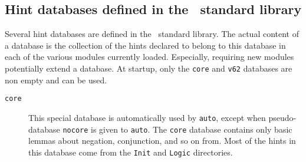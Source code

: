\begin{coq_example*}





\subsection{Hint databases defined in the \Coq\ standard library}

Several hint databases are defined in the \Coq\ standard library.  The
actual content of a database is the collection of the hints declared
to belong to this database in each of the various modules currently
loaded.  Especially, requiring new modules potentially extend a
database. At {\Coq} startup, only the {\tt core} and {\tt v62}
databases are non empty and can be used.

\begin{description}

\item[\tt core] This special database is automatically used by
  \texttt{auto}, except when pseudo-database \texttt{nocore} is
  given to \texttt{auto}. The \texttt{core} database contains
  only basic lemmas about negation,
  conjunction, and so on from. Most of the hints in this database come
  from the \texttt{Init} and \texttt{Logic} directories.


\end{description}
\end{coq_example*}
